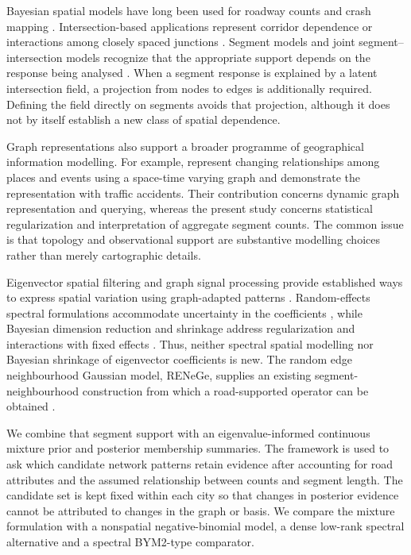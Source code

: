 \documentclass[11pt]{article}
\begin{document}
Bayesian spatial models have long been used for roadway counts and crash mapping \citep{song2006,aguerovalverde2008}. Intersection-based applications represent corridor dependence or interactions among closely spaced junctions \citep{guo2010,xie2014}. Segment models and joint segment--intersection models recognize that the appropriate support depends on the response being analysed \citep{aguerovalverde2008,zenghuang2014}. When a segment response is explained by a latent intersection field, a projection from nodes to edges is additionally required. Defining the field directly on segments avoids that projection, although it does not by itself establish a new class of spatial dependence.

Graph representations also support a broader programme of geographical information modelling. For example, \citet{maduako2019} represent changing relationships among places and events using a space-time varying graph and demonstrate the representation with traffic accidents. Their contribution concerns dynamic graph representation and querying, whereas the present study concerns statistical regularization and interpretation of aggregate segment counts. The common issue is that topology and observational support are substantive modelling choices rather than merely cartographic details.

Eigenvector spatial filtering and graph signal processing provide established ways to express spatial variation using graph-adapted patterns \citep{griffith2003,griffith2019,shuman2013}. Random-effects spectral formulations accommodate uncertainty in the coefficients \citep{murakami2015}, while Bayesian dimension reduction and shrinkage address regularization and interactions with fixed effects \citep{hughes2013,donegan2020}. Thus, neither spectral spatial modelling nor Bayesian shrinkage of eigenvector coefficients is new. The random edge neighbourhood Gaussian model, RENeGe, supplies an existing segment-neighbourhood construction from which a road-supported operator can be obtained \citep{cruzreyes2023spasta}.

We combine that segment support with an eigenvalue-informed continuous mixture prior and posterior membership summaries. The framework is used to ask which candidate network patterns retain evidence after accounting for road attributes and the assumed relationship between counts and segment length. The candidate set is kept fixed within each city so that changes in posterior evidence cannot be attributed to changes in the graph or basis. We compare the mixture formulation with a nonspatial negative-binomial model, a dense low-rank spectral alternative and a spectral BYM2-type comparator.
\end{document}
